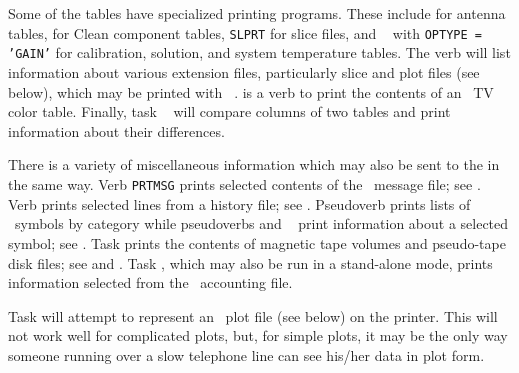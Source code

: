      Some of the tables have specialized printing programs.  These
include {\tt {}} for antenna tables, {\tt {}} for
Clean component tables, {\tt SLPRT} for slice files, and {\tt
{}} with {\tt OPTYPE = 'GAIN'} for calibration, solution,
and system temperature tables.  The verb {\tt {}} will
list information about various extension files, particularly slice and
plot files (see below), which may be printed with {\tt
{}}\@.  {\tt {}} is a verb to print the
contents of an \AIPS\ TV color table.  Finally, task {\tt
{}} will compare columns of two tables and print information
about their differences.


     There is a variety of miscellaneous information which may also be
sent to the  in the same way.  Verb {\tt PRTMSG} prints
selected contents of the \AIPS\ message file; see .  Verb
{\tt {}} prints selected lines from a history file; see
.  Pseudoverb {\tt {}} prints lists of \AIPS\
symbols by category while pseudoverbs {\tt {}} and {\tt
\tndx{EXPLAIN}} print information about a selected symbol; see
.  Task {\tt {}} prints the contents of magnetic
tape volumes and pseudo-tape disk files; see \Sec{prttp} and
.  Task {\tt {}}, which may also be run in a
stand-alone mode, prints information selected from the \AIPS\
accounting file.

     Task {\tt {}} will attempt to represent an \AIPS\ plot
file (see below) on the printer.  This will not work well for
complicated plots, but, for simple plots, it may be the only way
someone running over a slow telephone line can see his/her data in
plot form.


